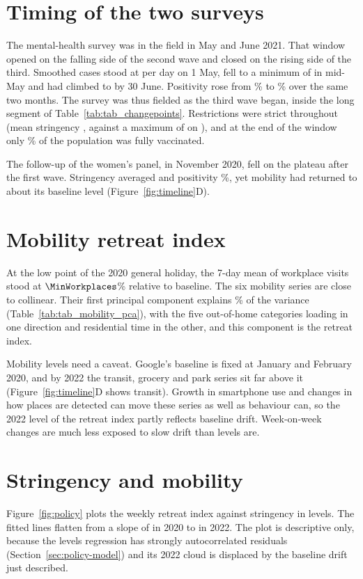 \section{Timing of the two surveys}\label{sec:timing}
The mental-health survey was in the field in May and June 2021. That window opened on the falling side of the second wave and closed on the rising side of the third. Smoothed cases stood at \SurveyCasesStart{} per day on 1 May, fell to a minimum of \SurveyCasesMin{} in mid-May and had climbed to \SurveyCasesEnd{} by 30 June. Positivity rose from \SurveyPosStart\% to \SurveyPosEnd\% over the same two months. The survey was thus fielded as the third wave began, inside the long segment of Table~\ref{tab:tab_changepoints}. Restrictions were strict throughout (mean stringency \SurveyStringency, against a maximum of \MaxStringency{} on \MaxStringencyDate), and at the end of the window only \SurveyVaxEnd\% of the population was fully vaccinated.

The follow-up of the women's panel, in November 2020, fell on the plateau after the first wave. Stringency averaged \PanelStringency{} and positivity \PanelPositivity\%, yet mobility had returned to about its baseline level (Figure~\ref{fig:timeline}D).

\section{Mobility retreat index}\label{sec:retreat}
At the low point of the 2020 general holiday, the 7-day mean of workplace visits stood at $\MinWorkplaces$\% relative to baseline. The six mobility series are close to collinear. Their first principal component explains \PCAOne\% of the variance (Table~\ref{tab:tab_mobility_pca}), with the five out-of-home categories loading in one direction and residential time in the other, and this component is the retreat index.


Mobility levels need a caveat. Google's baseline is fixed at January and February 2020, and by 2022 the transit, grocery and park series sit far above it (Figure~\ref{fig:timeline}D shows transit). Growth in smartphone use and changes in how places are detected can move these series as well as behaviour can, so the 2022 level of the retreat index partly reflects baseline drift. Week-on-week changes are much less exposed to slow drift than levels are.

\section{Stringency and mobility}
Figure~\ref{fig:policy} plots the weekly retreat index against stringency in levels. The fitted lines flatten from a slope of \PolLevSlopeA{} in 2020 to \PolLevSlopeC{} in 2022. The plot is descriptive only, because the levels regression has strongly autocorrelated residuals (Section~\ref{sec:policy-model}) and its 2022 cloud is displaced by the baseline drift just described.

